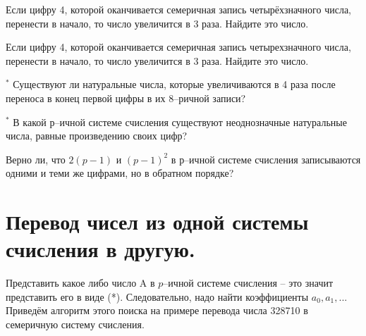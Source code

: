 \begin{thm}
    Если цифру 4, которой оканчивается семеричная запись четырёхзначного числа, перенести в начало, то число увеличится в 3 раза. Найдите это число.
\end{thm}

\begin{thm}
    Если цифру 4, которой оканчивается семеричная запись четырехзначного числа, перенести в начало, то число увеличится в 3 раза. Найдите это число.
\end{thm}
 
\begin{thm} $^*$
    Существуют ли натуральные числа, которые увеличиваются в 4 раза после переноса в конец первой цифры в их 8--ричной записи?
\end{thm}

\begin{thm} $^*$
    В какой р--ичной системе счисления существуют неоднозначные натуральные числа, равные произведению своих цифр?
\end{thm}

\begin{thm}
    Верно ли, что $2(p - 1)$ и $(p - 1)^2$ в $р$--ичной системе счисления записываются одними и теми же цифрами, но в обратном порядке?
\end{thm}

\section{Перевод чисел из одной системы счисления в другую.}

Представить какое либо число A в $p$--ичной системе счисления -- это значит представить его в виде (*).
Следовательно, надо найти коэффициенты $a_0, a_1, ...$ Приведём алгоритм этого поиска на примере перевода числа 328710 в семеричную систему счисления.


